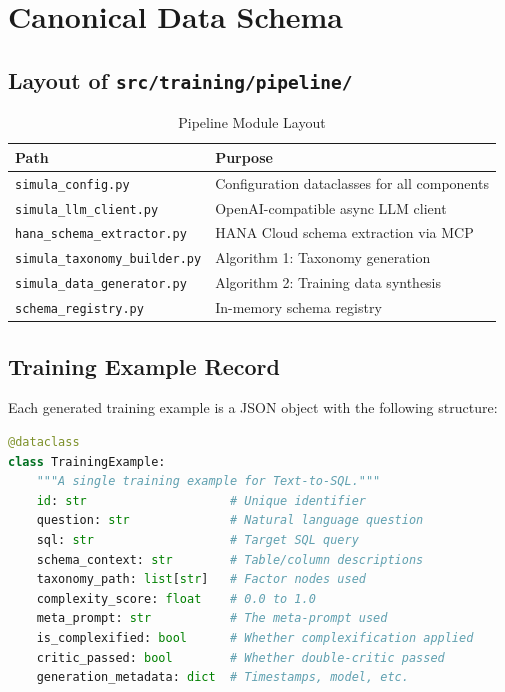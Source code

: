 \section{Canonical Data Schema}
\label{chap:schema}

\subsection{Layout of \texttt{src/training/pipeline/}}

\begin{table}[H]
\centering
\caption{Pipeline Module Layout}
\label{tab:module-layout}
\begin{tabularx}{\textwidth}{lX}
\toprule
\textbf{Path} & \textbf{Purpose} \\
\midrule
\texttt{simula\_config.py} & Configuration dataclasses for all components \\
\texttt{simula\_llm\_client.py} & OpenAI-compatible async LLM client \\
\texttt{hana\_schema\_extractor.py} & HANA Cloud schema extraction via MCP \\
\texttt{simula\_taxonomy\_builder.py} & Algorithm 1: Taxonomy generation \\
\texttt{simula\_data\_generator.py} & Algorithm 2: Training data synthesis \\
\texttt{schema\_registry.py} & In-memory schema registry \\
\bottomrule
\end{tabularx}
\end{table}

\subsection{Training Example Record}

Each generated training example is a JSON object with the following structure:

\begin{lstlisting}[language=Python,caption={TrainingExample dataclass (simula\_data\_generator.py)}]
@dataclass
class TrainingExample:
    """A single training example for Text-to-SQL."""
    id: str                    # Unique identifier
    question: str              # Natural language question
    sql: str                   # Target SQL query
    schema_context: str        # Table/column descriptions
    taxonomy_path: list[str]   # Factor nodes used
    complexity_score: float    # 0.0 to 1.0
    meta_prompt: str           # The meta-prompt used
    is_complexified: bool      # Whether complexification applied
    critic_passed: bool        # Whether double-critic passed
    generation_metadata: dict  # Timestamps, model, etc.
\end{lstlisting}

